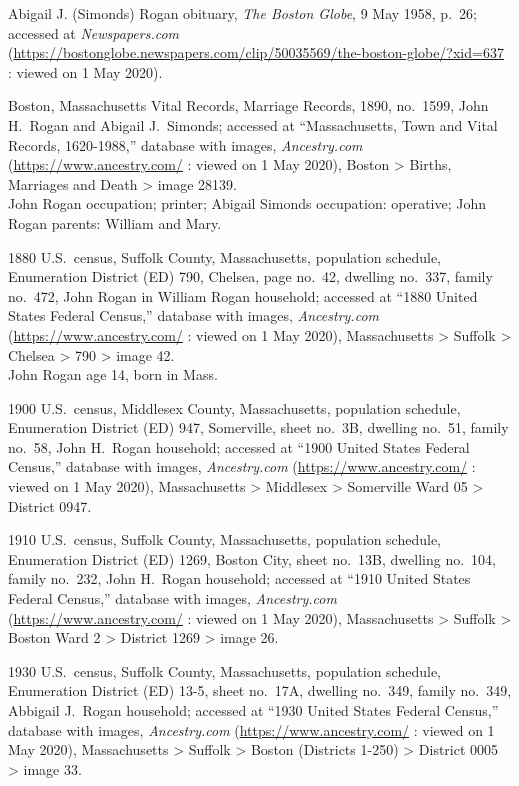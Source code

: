 \begin{thebibliography}{999}
	Abigail J. (Simonds) Rogan obituary, \textit{The Boston Globe}, 9 May 1958, p.\ 26; accessed at \textit{Newspapers.com} (\url{https://bostonglobe.newspapers.com/clip/50035569/the-boston-globe/?xid=637} : viewed on 1 May 2020).
	
	Boston, Massachusetts Vital Records, Marriage Records, 1890, no.\ 1599, John H.\ Rogan and Abigail J.\ Simonds; accessed at ``Massachusetts, Town and Vital Records, 1620-1988,'' database with images, \textit{Ancestry.com} (\url{https://www.ancestry.com/} : viewed on 1 May 2020), Boston > Births, Marriages and Death > image 28139.\\
	John Rogan occupation; printer; Abigail Simonds occupation: operative; John Rogan parents: William and Mary.
	
	1880 U.S.\ census, Suffolk County, Massachusetts, population schedule, Enumeration District (ED) 790, Chelsea, page no.\ 42, dwelling no.\ 337, family no.\ 472, John Rogan in William Rogan household; accessed at ``1880 United States Federal Census,'' database with images, \textit{Ancestry.com} (\url{https://www.ancestry.com/} : viewed on 1 May 2020), Massachusetts > Suffolk > Chelsea > 790 > image 42.\\
	John Rogan age 14, born in Mass.
	
	1900 U.S.\ census, Middlesex County, Massachusetts, population schedule, Enumeration District (ED) 947, Somerville, sheet no.\ 3B, dwelling no.\ 51, family no.\ 58, John H.\ Rogan household; accessed at ``1900 United States Federal Census,'' database with images, \textit{Ancestry.com} (\url{https://www.ancestry.com/} : viewed on 1 May 2020), Massachusetts > Middlesex > Somerville Ward 05 > District 0947.
	
	1910 U.S.\ census, Suffolk County, Massachusetts, population schedule, Enumeration District (ED) 1269, Boston City, sheet no.\ 13B, dwelling no.\ 104, family no.\ 232, John H.\ Rogan household; accessed at ``1910 United States Federal Census,'' database with images, \textit{Ancestry.com} (\url{https://www.ancestry.com/} : viewed on 1 May 2020), Massachusetts > Suffolk > Boston Ward 2 > District 1269 > image 26.
	
	1930 U.S.\ census, Suffolk County, Massachusetts, population schedule, Enumeration District (ED) 13-5, sheet no.\ 17A, dwelling no.\ 349, family no.\ 349, Abbigail J.\ Rogan household; accessed at ``1930 United States Federal Census,'' database with images, \textit{Ancestry.com} (\url{https://www.ancestry.com/} : viewed on 1 May 2020), Massachusetts > Suffolk > Boston (Districts 1-250) > District 0005 > image 33.
	

\end{thebibliography}

